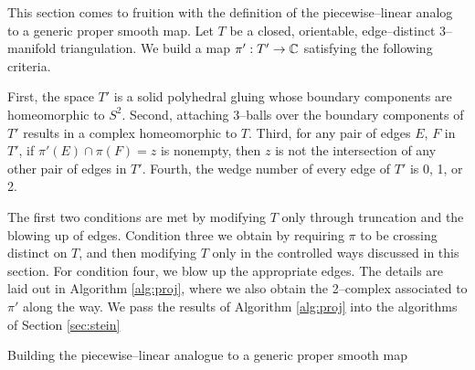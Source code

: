 This section comes to fruition with the definition of the piecewise--linear analog to a generic proper smooth map.
Let $T$ be a closed, orientable, edge--distinct 3--manifold triangulation.
We build a map $\pi':T'\to\mathbb{C}$ satisfying the following criteria.

First, the space $T'$ is a solid polyhedral gluing whose boundary components are homeomorphic to $S^2$.
Second, attaching 3--balls over the boundary components of $T'$ results in a complex homeomorphic to $T$.
Third, for any pair of edges $E$, $F$ in $T'$, if $\pi'(E)\cap\pi(F)=z$ is nonempty, then $z$ is not the intersection of any other pair of edges in $T'$.
Fourth, the wedge number of every edge of $T'$ is 0, 1, or 2.

The first two conditions are met by modifying $T$ only through truncation and the blowing up of edges.
Condition three we obtain by requiring $\pi$ to be crossing distinct on $T$, and then modifying $T$ only in the controlled ways discussed in this section.
For condition four, we blow up the appropriate edges.
The details are laid out in Algorithm \ref{alg:proj}, where we also obtain the 2--complex associated to $\pi'$ along the way.
We pass the results of Algorithm \ref{alg:proj} into the algorithms of Section \ref{sec:stein}

\begin{algorithm}[H]
	\caption{Building the piecewise--linear analogue to a generic proper smooth map}
	\label{alg:proj}
\end{algorithm}